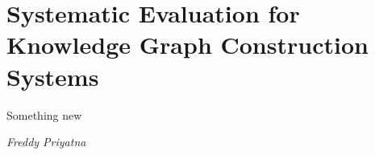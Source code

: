 \chapter{Systematic Evaluation for Knowledge Graph Construction Systems}
\label{chapter:evaluation}

\epigraph{Something new}{\textit{Freddy Priyatna}}






